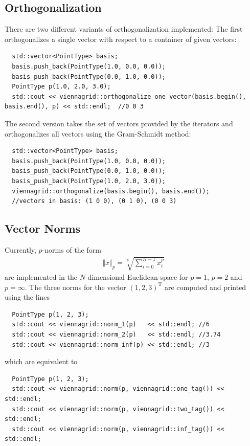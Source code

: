    \subsection{Orthogonalization}
 There are two different variants of orthogonalization implemented: The first orthogonalizes a single vector with respect to a container of given vectors:
 \begin{lstlisting}
  std::vector<PointType> basis;
  basis.push_back(PointType(1.0, 0.0, 0.0));
  basis_push_back(PointType(0.0, 1.0, 0.0));
  PointType p(1.0, 2.0, 3.0);
  std::cout << viennagrid::orthogonalize_one_vector(basis.begin(), basis.end(), p) << std::endl;  //0 0 3
 \end{lstlisting}
 The second version takes the set of vectors provided by the iterators and orthogonalizes all vectors using the Gram-Schmidt method:
 \begin{lstlisting}
  std::vector<PointType> basis;
  basis.push_back(PointType(1.0, 0.0, 0.0));
  basis_push_back(PointType(0.0, 1.0, 0.0));
  basis_push_back(PointType(1.0, 2.0, 3.0));
  viennagrid::orthogonalize(basis.begin(), basis.end());
  //vectors in basis: (1 0 0), (0 1 0), (0 0 3)
 \end{lstlisting}

  \subsection{Vector Norms}
 Currently, $p$-norms of the form
  \begin{align}
   \Vert x \Vert_p = \sqrt[p]{\sum_{i=0}^{N-1} x_i^p}
  \end{align}
 are implemented in the $N$-dimensional Euclidean space for $p=1$, $p=2$ and $p=\infty$. The three norms for the vector $(1,2,3)^\mathrm{T}$ are computed and printed using the lines
 \begin{lstlisting}
  PointType p(1, 2, 3);
  std::cout << viennagrid::norm_1(p)   << std::endl; //6
  std::cout << viennagrid::norm_2(p)   << std::endl; //3.74
  std::cout << viennagrid::norm_inf(p) << std::endl; //3
 \end{lstlisting}
which are equivalent to
 \begin{lstlisting}
  PointType p(1, 2, 3);
  std::cout << viennagrid::norm(p, viennagrid::one_tag()) << std::endl;
  std::cout << viennagrid::norm(p, viennagrid::two_tag()) << std::endl;
  std::cout << viennagrid::norm(p, viennagrid::inf_tag()) << std::endl;
 \end{lstlisting}


